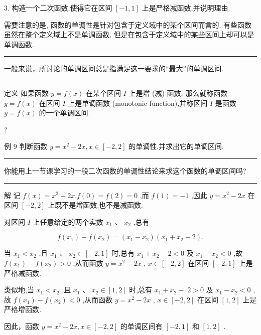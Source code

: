 \documentclass[10pt]{article}
\newcommand{\HRule}{\begin{center}\rule{0.9\linewidth}{0.2mm}\end{center}}
\begin{document}
3. 构造一个二次函数,使得它在区间 \(\left\lbrack  {-1,1}\right\rbrack\) 上是严格减函数,并说明理由.

需要注意的是, 函数的单调性是针对包含于定义域中的某个区间而言的. 有些函数虽然在整个定义域上不是单调函数, 但是在包含于定义域中的某些区间上却可以是单调函数.

\HRule

一般来说，所讨论的单调区间总是指满足这一要求的“最大”的单调区间.

\HRule

定义 如果函数 \(y = f\left( x\right)\) 在某个区间 \(I\) 上是增 (减) 函数, 那么就称函数 \(y = f\left( x\right)\) 在区间 \(I\) 上是单调函数 (monotonic function),并称区间 \(I\) 是函数 \(y = f\left( x\right)\) 的一个单调区间.

?

例 9 判断函数 \(y = {x}^{2} - {2x},x \in  \left\lbrack  {-2,2}\right\rbrack\) 的单调性,并求出它的单调区间.

\HRule

你能用上一节课学习的一般二次函数的单调性结论来求这个函数的单调区间吗?

\HRule

解 记 \(f\left( x\right)  = {x}^{2} - {2x}.f\left( 0\right)  = f\left( 2\right)  = 0\) ,而 \(f\left( 1\right)  =  - 1\) ,因此 \(y = {x}^{2} - {2x}\) 在区间 \(\left\lbrack  {-2,2}\right\rbrack\) 上既不是增函数,也不是减函数.

对区间 \(I\) 上任意给定的两个实数 \({x}_{1}\text{ 、 }{x}_{2}\) ,总有

\[
f\left( {x}_{1}\right)  - f\left( {x}_{2}\right)  = \left( {{x}_{1} - {x}_{2}}\right) \left( {{x}_{1} + {x}_{2} - 2}\right) .
\]

当 \({x}_{1} < {x}_{2}\) ,且 \({x}_{1}\text{ 、 }{x}_{2} \in  \left\lbrack  {-2,1}\right\rbrack\) 时,总有 \({x}_{1} + {x}_{2} - 2 < 0\) 及 \({x}_{1} - {x}_{2} < 0\) ,故 \(f\left( {x}_{1}\right)  - f\left( {x}_{2}\right)  > 0\) ,从而函数 \(y = {x}^{2} - {2x}\) , \(x \in  \left\lbrack  {-2,2}\right\rbrack\) 在区间 \(\left\lbrack  {-2,1}\right\rbrack\) 上是严格减函数.

类似地,当 \({x}_{1} < {x}_{2}\) ,且 \({x}_{1}\text{ 、 }{x}_{2} \in  \left\lbrack  {1,2}\right\rbrack\) 时,总有 \({x}_{1} + {x}_{2} - \; 2 > 0\) 及 \({x}_{1} - {x}_{2} < 0\) ,故 \(f\left( {x}_{1}\right)  - f\left( {x}_{2}\right)  < 0\) ,从而函数 \(y = {x}^{2} - {2x}\) , \(x \in  \left\lbrack  {-2,2}\right\rbrack\) 在区间 \(\left\lbrack  {1,2}\right\rbrack\) 上是严格增函数.

因此，函数 \(y = {x}^{2} - {2x},x \in  \left\lbrack  {-2,2}\right\rbrack\) 的单调区间有 \(\left\lbrack  {-2,1}\right\rbrack\) 和 \(\left\lbrack  {1,2}\right\rbrack\) .
\end{document}
